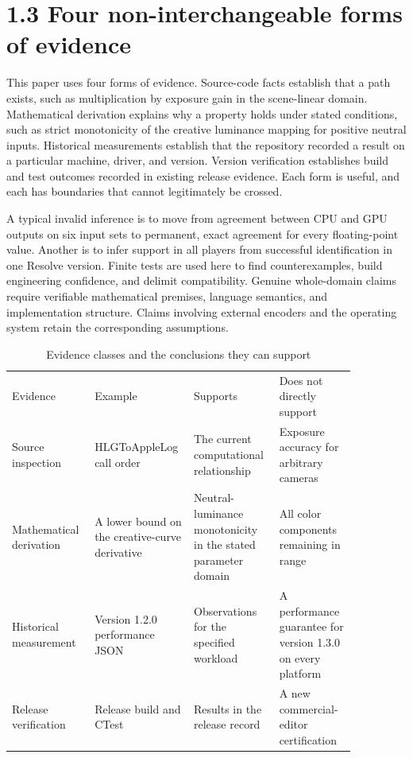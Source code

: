 \documentclass[11pt,a4paper,openany]{book}
\begin{document}
\section*{1.3 Four non-interchangeable forms of evidence}
This paper uses four forms of evidence. Source-code facts establish that a path exists, such as multiplication by exposure gain in the scene-linear domain. Mathematical derivation explains why a property holds under stated conditions, such as strict monotonicity of the creative luminance mapping for positive neutral inputs. Historical measurements establish that the repository recorded a result on a particular machine, driver, and version. Version verification establishes build and test outcomes recorded in existing release evidence. Each form is useful, and each has boundaries that cannot legitimately be crossed.

A typical invalid inference is to move from agreement between CPU and GPU outputs on six input sets to permanent, exact agreement for every floating-point value. Another is to infer support in all players from successful identification in one Resolve version. Finite tests are used here to find counterexamples, build engineering confidence, and delimit compatibility. Genuine whole-domain claims require verifiable mathematical premises, language semantics, and implementation structure. Claims involving external encoders and the operating system retain the corresponding assumptions.


\begin{longtable}{p{0.215\linewidth}p{0.215\linewidth}p{0.215\linewidth}p{0.215\linewidth}}
\caption{Evidence classes and the conclusions they can support}\\
\toprule
Evidence & Example & Supports & Does not directly support\\
Source inspection & HLGToAppleLog call order & The current computational relationship & Exposure accuracy for arbitrary cameras\\
Mathematical derivation & A lower bound on the creative-curve derivative & Neutral-luminance monotonicity in the stated parameter domain & All color components remaining in range\\
Historical measurement & Version 1.2.0 performance JSON & Observations for the specified workload & A performance guarantee for version 1.3.0 on every platform\\
Release verification & Release build and CTest & Results in the release record & A new commercial-editor certification\\
\bottomrule
\end{longtable}
\end{document}
